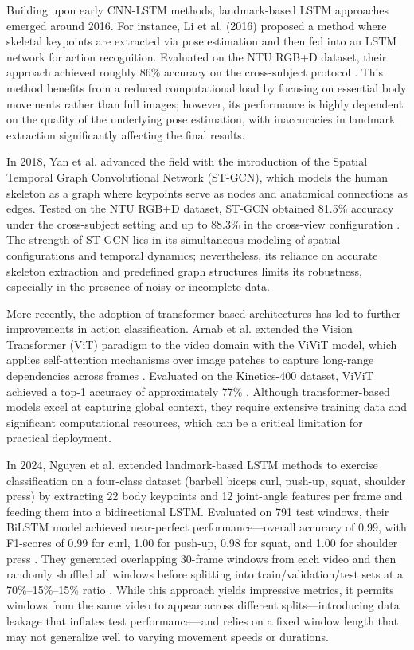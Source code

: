\documentclass[runningheads]{llncs}
\begin{document}
Building upon early CNN-LSTM methods, landmark-based LSTM approaches emerged around 2016. 
For instance, Li et al. (2016) proposed a method where skeletal keypoints are extracted via pose estimation and then fed into an LSTM network for action recognition. 
Evaluated on the NTU RGB+D dataset, their approach achieved roughly 86\% accuracy on the cross-subject protocol \cite{li2017}. 
This method benefits from a reduced computational load by focusing on essential body movements rather than full images; however, its performance is highly dependent on the quality of the underlying pose estimation, with inaccuracies in landmark extraction significantly affecting the final results.

In 2018, Yan et al. advanced the field with the introduction of the Spatial Temporal Graph Convolutional Network (ST-GCN), which models the human skeleton as a graph where keypoints serve as nodes and anatomical connections as edges. 
Tested on the NTU RGB+D dataset, ST-GCN obtained 81.5\% accuracy under the cross-subject setting and up to 88.3\% in the cross-view configuration \cite{yan2018}. 
The strength of ST-GCN lies in its simultaneous modeling of spatial configurations and temporal dynamics; nevertheless, its reliance on accurate skeleton extraction and predefined graph structures limits its robustness, especially in the presence of noisy or incomplete data.

More recently, the adoption of transformer-based architectures has led to further improvements in action classification. 
Arnab et al. extended the Vision Transformer (ViT) paradigm to the video domain with the ViViT model, which applies self-attention mechanisms over image patches to capture long-range dependencies across frames \cite{arnab2021}. 
Evaluated on the Kinetics-400 dataset, ViViT achieved a top-1 accuracy of approximately 77\% . Although transformer-based models excel at capturing global context, they require extensive training data and significant computational resources, which can be a critical limitation for practical deployment.

In 2024, Nguyen et al. extended landmark-based LSTM methods to exercise classification on a four-class dataset (barbell biceps curl, push-up, squat, shoulder press) by extracting 22 body keypoints and 12 joint-angle features per frame and feeding them into a bidirectional LSTM. 
Evaluated on 791 test windows, their BiLSTM model achieved near-perfect performance—overall accuracy of 0.99, with F1-scores of 0.99 for curl, 1.00 for push-up, 0.98 for squat, and 1.00 for shoulder press . 
They generated overlapping 30-frame windows from each video and then randomly shuffled all windows before splitting into train/validation/test sets at a 70\%–15\%–15\% ratio . 
While this approach yields impressive metrics, it permits windows from the same video to appear across different splits—introducing data leakage that inflates test performance—and relies on a fixed window length that may not generalize well to varying movement speeds or durations.  \cite{riccio2024}
\end{document}
